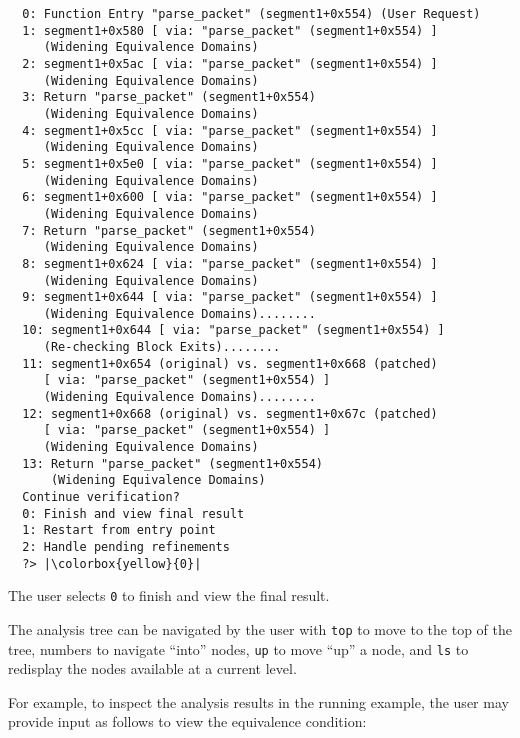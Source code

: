 \begin{lstlisting}
  0: Function Entry "parse_packet" (segment1+0x554) (User Request)
  1: segment1+0x580 [ via: "parse_packet" (segment1+0x554) ]
     (Widening Equivalence Domains)
  2: segment1+0x5ac [ via: "parse_packet" (segment1+0x554) ]
     (Widening Equivalence Domains)
  3: Return "parse_packet" (segment1+0x554)
     (Widening Equivalence Domains)
  4: segment1+0x5cc [ via: "parse_packet" (segment1+0x554) ]
     (Widening Equivalence Domains)
  5: segment1+0x5e0 [ via: "parse_packet" (segment1+0x554) ]
     (Widening Equivalence Domains)
  6: segment1+0x600 [ via: "parse_packet" (segment1+0x554) ]
     (Widening Equivalence Domains)
  7: Return "parse_packet" (segment1+0x554)
     (Widening Equivalence Domains)
  8: segment1+0x624 [ via: "parse_packet" (segment1+0x554) ]
     (Widening Equivalence Domains)
  9: segment1+0x644 [ via: "parse_packet" (segment1+0x554) ]
     (Widening Equivalence Domains)........
  10: segment1+0x644 [ via: "parse_packet" (segment1+0x554) ]
     (Re-checking Block Exits)........
  11: segment1+0x654 (original) vs. segment1+0x668 (patched)
     [ via: "parse_packet" (segment1+0x554) ]
     (Widening Equivalence Domains)........
  12: segment1+0x668 (original) vs. segment1+0x67c (patched)
     [ via: "parse_packet" (segment1+0x554) ]
     (Widening Equivalence Domains)
  13: Return "parse_packet" (segment1+0x554)
      (Widening Equivalence Domains)
  Continue verification?
  0: Finish and view final result
  1: Restart from entry point
  2: Handle pending refinements
  ?> |\colorbox{yellow}{0}|
\end{lstlisting}

The user selects \texttt{0} to finish and view the final result.

The \pate{} analysis tree can be navigated by the user with \texttt{top} to move to the top of the tree, numbers to navigate ``into'' nodes, \texttt{up} to move ``up'' a node, and \texttt{ls} to redisplay the nodes available at a current level.

For example, to inspect the analysis results in the running example, the user may provide input as follows to view the equivalence condition:

